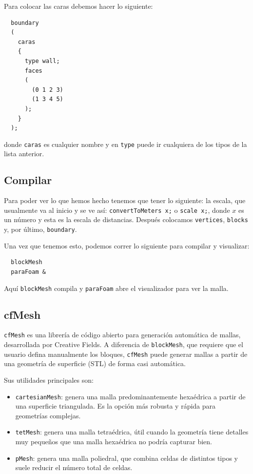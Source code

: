 Para colocar las caras debemos hacer lo siguiente:
\begin{verbatim}
  boundary
  (
    caras
    {
      type wall;
      faces
      (
        (0 1 2 3)
        (1 3 4 5)
      );
    }
  );
\end{verbatim}
donde \texttt{caras} es cualquier nombre y en \texttt{type} puede ir cualquiera de los tipos de la lista anterior.

\subsection{Compilar}

Para poder ver lo que hemos hecho tenemos que tener lo siguiente: la escala, que usualmente va al inicio y se ve así: \texttt{convertToMeters x;} o \texttt{scale x;}, donde $x$ es un número y esta es la escala de distancias. Después colocamos \texttt{vertices}, \texttt{blocks} y, por último, \texttt{boundary}.

Una vez que tenemos esto, podemos correr lo siguiente para compilar y visualizar:
\begin{verbatim}
  blockMesh
  paraFoam &
\end{verbatim}
Aquí \texttt{blockMesh} compila y \texttt{paraFoam} abre el visualizador para ver la malla.

\subsection{cfMesh}

\texttt{cfMesh} es una librería de código abierto para generación automática de mallas, desarrollada por Creative Fields. A diferencia de \texttt{blockMesh}, que requiere que el usuario defina manualmente los bloques, \texttt{cfMesh} puede generar mallas a partir de una geometría de superficie (STL) de forma casi automática.

Sus utilidades principales son:
\begin{itemize}
  \item \texttt{cartesianMesh}: genera una malla predominantemente hexaédrica a partir de una superficie triangulada. Es la opción más robusta y rápida para geometrías complejas.
  \item \texttt{tetMesh}: genera una malla tetraédrica, útil cuando la geometría tiene detalles muy pequeños que una malla hexaédrica no podría capturar bien.
  \item \texttt{pMesh}: genera una malla poliedral, que combina celdas de distintos tipos y suele reducir el número total de celdas.
\end{itemize}

